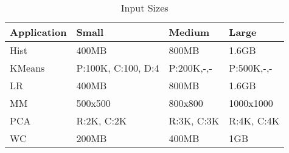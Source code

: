 \begin{frame}[t]
\begin{columns}[t]
\begin{onlyenv}
\begin{table}
{			\begin{tabular}{|@{} l| @{} l | @{} l| @{} l|}
				\hline
				\textbf{Application} & \textbf{Small} & \textbf{Medium} & \textbf{Large}\\
				\hline
				Hist & 400MB & 800MB & 1.6GB\\
				\hline
				KMeans & P:100K, C:100, D:4 & P:200K,-,- & P:500K,-,-\\
				\hline
				LR & 400MB & 800MB & 1.6GB\\
				\hline
				MM & 500x500 & 800x800 & 1000x1000\\
				\hline
				PCA & R:2K, C:2K & R:3K, C:3K & R:4K, C:4K\\
				\hline
				WC & 200MB & 400MB & 1GB\\
				\hline
			\end{tabular}
			}
			\caption*{Input Sizes}
		\end{table}
		\end{onlyenv}
	\end{columns}
\end{frame}

